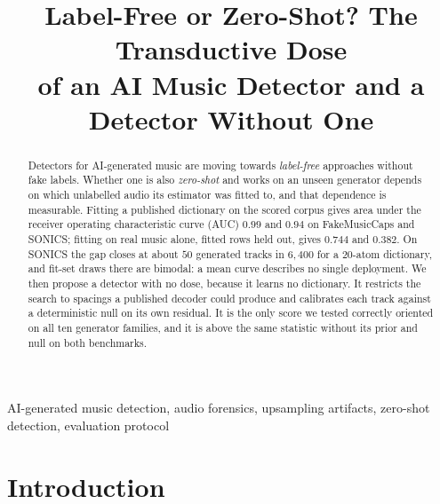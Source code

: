 \documentclass{article}
\title{Label-Free or Zero-Shot? The Transductive Dose \\
of an AI Music Detector and a Detector Without One}
\begin{document}
\ninept
\maketitle

\begin{abstract}
Detectors for AI-generated music are moving towards \emph{label-free} approaches without
fake labels. Whether one is also \emph{zero-shot} and works on an unseen
generator depends on which unlabelled audio its estimator was fitted to, and
that dependence is measurable. Fitting a published dictionary on the scored corpus
gives area under the receiver operating characteristic curve (AUC) $0.99$
and $0.94$ on FakeMusicCaps and SONICS; fitting on real music alone, fitted rows
held out, gives $0.744$ and $0.382$. On SONICS the gap closes at about $50$ generated
tracks in $6{,}400$ for a $20$-atom dictionary, and fit-set draws there are bimodal:
a mean curve describes no single deployment. We then propose a detector with no
dose, because it learns no dictionary. It restricts the search to spacings a
published decoder could produce and calibrates each track against a deterministic
null on its own residual. It is the only score we tested correctly oriented on all
ten generator families, and it is above the same statistic without its prior and
null on both benchmarks.
\end{abstract}

\begin{keywords}
AI-generated music detection, audio forensics, upsampling artifacts,
zero-shot detection, evaluation protocol
\end{keywords}

\section{Introduction}
\label{sec:intro}
\end{document}
